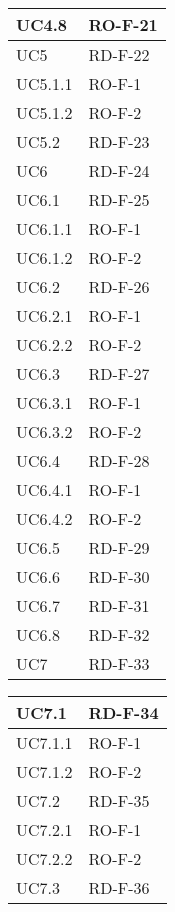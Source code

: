 \begin{center}
\begin{tabular}{ |m{8em}|m{13em}| }
    \hline
    UC4.8       &   RO-F-21 \\
    \hline
    UC5         &   RD-F-22 \\
    \hline
    UC5.1.1     &   RO-F-1 \\
    \hline
    UC5.1.2     &   RO-F-2 \\
    \hline
    UC5.2       &   RD-F-23 \\
    \hline
    UC6         &   RD-F-24 \\
    \hline
    UC6.1       &   RD-F-25 \\
    \hline
    UC6.1.1     &   RO-F-1 \\
    \hline
    UC6.1.2     &   RO-F-2 \\
    \hline
    UC6.2       &   RD-F-26 \\
    \hline
    UC6.2.1     &   RO-F-1 \\
    \hline
    UC6.2.2     &   RO-F-2 \\
    \hline
    UC6.3       &   RD-F-27 \\
    \hline
    UC6.3.1     &   RO-F-1 \\
    \hline
    UC6.3.2     &   RO-F-2 \\
    \hline
    UC6.4       &   RD-F-28 \\
    \hline
    UC6.4.1     &   RO-F-1 \\
    \hline
    UC6.4.2     &   RO-F-2 \\
    \hline
    UC6.5       &   RD-F-29 \\
    \hline
    UC6.6       &   RD-F-30 \\
    \hline
    UC6.7       &   RD-F-31 \\
    \hline
    UC6.8       &   RD-F-32 \\
    \hline
    UC7         &   RD-F-33 \\
    \hline
    \end{tabular}
    \newpage
    \begin{tabular}{ |m{8em}|m{13em}| }
    \hline
    UC7.1       &   RD-F-34 \\
    \hline
    UC7.1.1     &   RO-F-1 \\
    \hline
    UC7.1.2     &   RO-F-2 \\
    \hline
    UC7.2       &   RD-F-35 \\
    \hline
    UC7.2.1     &   RO-F-1 \\
    \hline
    UC7.2.2     &   RO-F-2 \\
    \hline
    UC7.3       &   RD-F-36 \\

\end{tabular}
\end{center}
